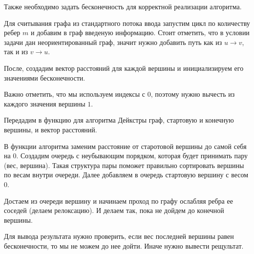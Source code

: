 Также необходимо задать бесконечность для корректной реализации алгоритма.

Для считывания графа из стандартного потока ввода запустим цикл по количеству ребер $m$ и добавим в граф
введеную информацию. Стоит отметить, что в условии задачи дан неориентированный граф, значит нужно добавить 
путь как из $u \to v$, так и из $v \to u$.

После, создадим вектор расстояний для каждой вершины и инициализируем его значениями бесконечности.

Важно отметить, что мы используем индексы с $0$, поэтому нужно вычесть из каждого значения вершины $1$.

Передадим в функцию для алгоритма Дейкстры граф, стартовую и конечную вершины, и вектор расстояний.

В функции алгоритма заменим расстояние от старотовой вершины до самой себя на $0$. Создадим очередь с 
неубывающим порядком, которая будет принимать пару (вес, вершина). Такая структура пары поможет 
правильно сортировать вершины по весам внутри очереди. Далее добавляем в очередь стартовую вершину с весом $0$.

Достаем из очереди вершину и начинаем проход по графу ослабляя ребра ее соседей (делаем релоксацию). И делаем
так, пока не дойдем до конечной вершины.

Для вывода результата нужно проверить, если вес последней вершины равен бесконечности, то мы не можем до нее дойти.
Иначе нужно вывести рещультат.

